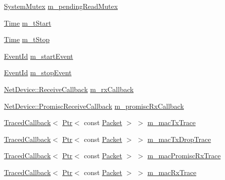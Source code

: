 \begin{DoxyCompactItemize}
\item 
\hyperlink{classns3_1_1SystemMutex}{System\+Mutex} \hyperlink{classns3_1_1FdNetDevice_a957f57e977ee857a0233a484c276d427}{m\+\_\+pending\+Read\+Mutex}
\item 
\hyperlink{classns3_1_1Time}{Time} \hyperlink{classns3_1_1FdNetDevice_a6349cf5842c54a0420f9e41422895efa}{m\+\_\+t\+Start}
\item 
\hyperlink{classns3_1_1Time}{Time} \hyperlink{classns3_1_1FdNetDevice_ac97346af9ad4364aa3d1d7db0516fca5}{m\+\_\+t\+Stop}
\item 
\hyperlink{classns3_1_1EventId}{Event\+Id} \hyperlink{classns3_1_1FdNetDevice_a759e74ace56841b2ae47c69ff0276b2f}{m\+\_\+start\+Event}
\item 
\hyperlink{classns3_1_1EventId}{Event\+Id} \hyperlink{classns3_1_1FdNetDevice_a010c8ac9ac2fffeb6ce1ffaf94b5a890}{m\+\_\+stop\+Event}
\item 
\hyperlink{classns3_1_1NetDevice_ad5e5e1ca187472bc2ba99575d8def568}{Net\+Device\+::\+Receive\+Callback} \hyperlink{classns3_1_1FdNetDevice_a5c3e9d04b053c707a4188f823a6bc2ab}{m\+\_\+rx\+Callback}
\item 
\hyperlink{classns3_1_1NetDevice_a427225795919f26c414bee2ea3f31ed2}{Net\+Device\+::\+Promisc\+Receive\+Callback} \hyperlink{classns3_1_1FdNetDevice_aa95f558a530aca66f7fe582559902160}{m\+\_\+promisc\+Rx\+Callback}
\item 
\hyperlink{classns3_1_1TracedCallback}{Traced\+Callback}$<$ \hyperlink{classns3_1_1Ptr}{Ptr}$<$ const \hyperlink{classns3_1_1Packet}{Packet} $>$ $>$ \hyperlink{classns3_1_1FdNetDevice_a7a067bc7ab39f2ebfcc925a58da4f519}{m\+\_\+mac\+Tx\+Trace}
\item 
\hyperlink{classns3_1_1TracedCallback}{Traced\+Callback}$<$ \hyperlink{classns3_1_1Ptr}{Ptr}$<$ const \hyperlink{classns3_1_1Packet}{Packet} $>$ $>$ \hyperlink{classns3_1_1FdNetDevice_ad204b6948cb00479cc229465c6c07ebb}{m\+\_\+mac\+Tx\+Drop\+Trace}
\item 
\hyperlink{classns3_1_1TracedCallback}{Traced\+Callback}$<$ \hyperlink{classns3_1_1Ptr}{Ptr}$<$ const \hyperlink{classns3_1_1Packet}{Packet} $>$ $>$ \hyperlink{classns3_1_1FdNetDevice_ac0fbee33fa2dc3d5349f33f794364fdb}{m\+\_\+mac\+Promisc\+Rx\+Trace}
\item 
\hyperlink{classns3_1_1TracedCallback}{Traced\+Callback}$<$ \hyperlink{classns3_1_1Ptr}{Ptr}$<$ const \hyperlink{classns3_1_1Packet}{Packet} $>$ $>$ \hyperlink{classns3_1_1FdNetDevice_a5d526995e92ac4957170d9b8a680bad1}{m\+\_\+mac\+Rx\+Trace}
\item 

\end{DoxyCompactItemize}

